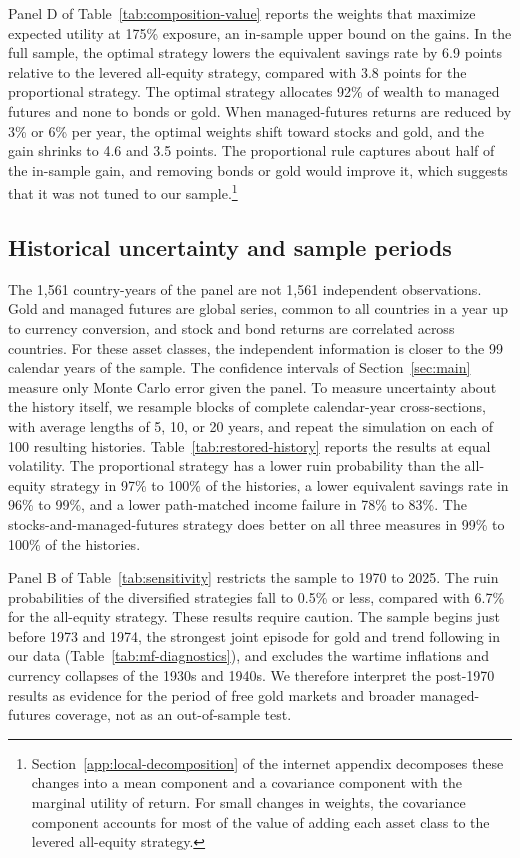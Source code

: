 \documentclass[12pt]{article}
\makeatletter
\newif\ifsubmission
\newcommand{\exhibitlist}{}
\newcommand{\exhibit}[1]{\ifsubmission\g@addto@macro\exhibitlist{}\else\fi}
\makeatother
\begin{document}
Panel D of Table~\ref{tab:composition-value} reports the weights that maximize expected utility at 175\%
exposure, an in-sample upper bound on the gains. In the full sample, the optimal strategy lowers the
equivalent savings rate by 6.9 points relative to the levered all-equity strategy, compared with 3.8
points for the proportional strategy. The optimal strategy allocates 92\% of wealth to managed futures and
none to bonds or gold. When managed-futures returns are reduced by 3\% or 6\% per year, the optimal weights
shift toward stocks and gold, and the gain shrinks to 4.6 and 3.5 points. The proportional rule captures
about half of the in-sample gain, and removing bonds or gold would improve it, which suggests that it was
not tuned to our sample.\footnote{Section~\ref{app:local-decomposition} of the internet appendix decomposes
these changes into a mean component and a covariance component with the marginal utility of return. For
small changes in weights, the covariance component accounts for most of the value of adding each asset
class to the levered all-equity strategy.}

\subsection{Historical uncertainty and sample periods}
\label{sec:history}

The 1,561 country-years of the panel are not 1,561 independent observations. Gold and managed futures are
global series, common to all countries in a year up to currency conversion, and stock and bond returns
are correlated across countries. For these asset classes, the independent information is closer to the
99 calendar years of the sample. The confidence intervals of Section~\ref{sec:main} measure only Monte Carlo
error given the panel. To measure uncertainty about the history itself, we resample blocks of complete
calendar-year cross-sections, with average lengths of 5, 10, or 20 years, and repeat the simulation on
each of 100 resulting histories. Table~\ref{tab:restored-history} reports the results at equal volatility.
The proportional strategy has a lower ruin probability than the all-equity strategy in 97\% to 100\% of the
histories, a lower equivalent savings rate in 96\% to 99\%, and a lower path-matched income failure in
78\% to 83\%. The stocks-and-managed-futures strategy does better on all three measures in 99\% to 100\% of
the histories.
\exhibit{figures/erc/history.tex}

Panel B of Table~\ref{tab:sensitivity} restricts the sample to 1970 to 2025. The ruin probabilities of the
diversified strategies fall to 0.5\% or less, compared with 6.7\% for the all-equity strategy. These results
require caution. The sample begins just before 1973 and 1974, the strongest joint episode for gold and
trend following in our data (Table~\ref{tab:mf-diagnostics}), and excludes the wartime inflations and
currency collapses of the 1930s and 1940s. We therefore interpret the post-1970 results as evidence for
the period of free gold markets and broader managed-futures coverage, not as an out-of-sample test.
\end{document}
